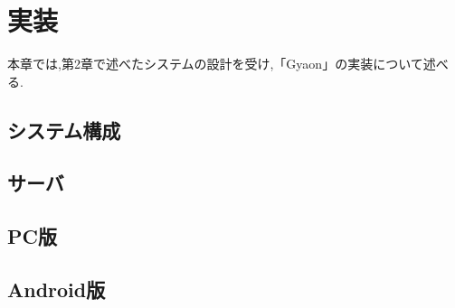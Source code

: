 \chapter{実装}
\label{chap:implementation}

本章では,第2章で述べたシステムの設計を受け,「Gyaon」の実装について述べる.

\newpage

\section{システム構成}

\section{サーバ}

\section{PC版}

\section{Android版}
